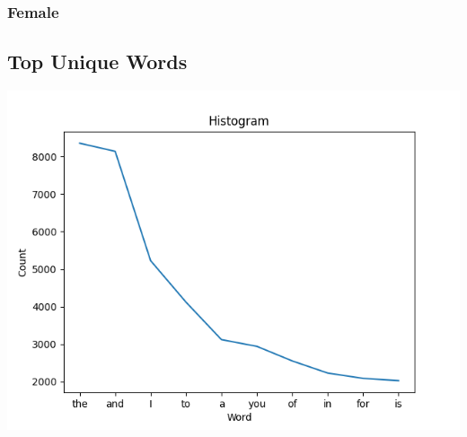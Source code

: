 \documentclass[rnd]{extarticle}
\begin{document}
		\subsubsection{Female}
		\begin{center}
		\end{center}

		
		\subsection{Top Unique Words}
		\includegraphics[width=1\textwidth]{../../stats/top_unique_words.png}
	
	
\end{document}
